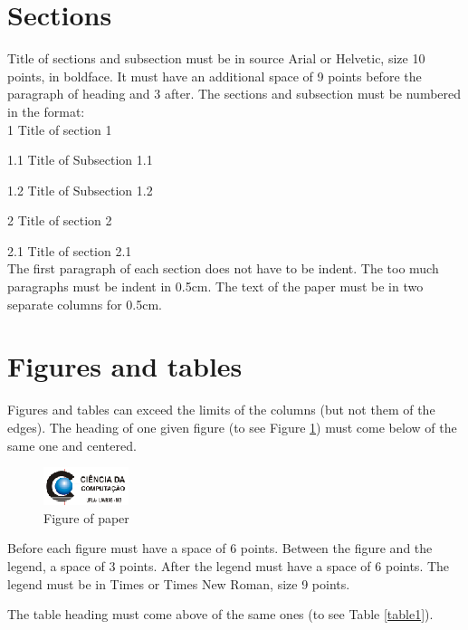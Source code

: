 \documentclass[10pt]{article}
\begin{document}
\section{Sections}

Title of sections and subsection must be in source Arial or Helvetic,
size 10 points, in boldface. It must have an additional space of 9
points before the paragraph of heading and 3 after. The sections and
subsection must be numbered in the format: \\

1 Title of section 1

1.1 Title of Subsection 1.1

1.2 Title of Subsection 1.2

2 Title of section 2

2.1 Title of section 2.1\\

The first paragraph of each section does not have to be indent. The
too much paragraphs must be indent in 0.5cm. The text of the paper
must be in two separate columns for 0.5cm.

\section{Figures and tables}

Figures and tables can exceed the limits of the columns (but not them
of the edges). The heading of one given figure (to see Figure
\ref{fig:1}) must come below of the same one and centered.

\begin{figure}[!htbp]
  \begin{center}
    \includegraphics[scale=3]{exfigura}
    \caption{Figure of paper}
    \label{fig:1}
  \end{center}
\end{figure}

Before each figure must have a space of 6 points.  Between the figure
and the legend, a space of 3 points. After the legend must have a
space of 6 points. The legend must be in Times or Times New Roman,
size 9 points.

The table heading must come above of the same ones (to see Table
\ref{table1}).
\end{document}
